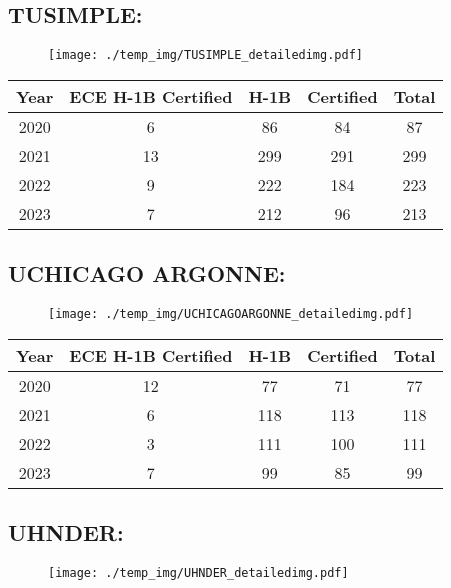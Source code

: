 \documentclass{article}%
\begin{document}
%
\newpage%
\subsection{TUSIMPLE:}%
\label{subsec:TUSIMPLE}%
\label{TUSIMPLEdetailed}%


\begin{figure}[htbp]%
\centering%
\texttt{[image: ./temp\_img/TUSIMPLE\_detailedimg.pdf]}%
\end{figure}

%
\begin{longtable}{c|c|c|c|c}%
\hline%
Year&ECE H{-}1B Certified&H{-}1B&Certified&Total\\%
\hline%
2020&6&86&84&87\\%
\hline%
2021&13&299&291&299\\%
\hline%
2022&9&222&184&223\\%
\hline%
2023&7&212&96&213\\%
\hline%
\end{longtable}

%
\newpage%
\subsection{UCHICAGO ARGONNE:}%
\label{subsec:UCHICAGOARGONNE}%
\label{UCHICAGOARGONNEdetailed}%


\begin{figure}[htbp]%
\centering%
\texttt{[image: ./temp\_img/UCHICAGOARGONNE\_detailedimg.pdf]}%
\end{figure}

%
\begin{longtable}{c|c|c|c|c}%
\hline%
Year&ECE H{-}1B Certified&H{-}1B&Certified&Total\\%
\hline%
2020&12&77&71&77\\%
\hline%
2021&6&118&113&118\\%
\hline%
2022&3&111&100&111\\%
\hline%
2023&7&99&85&99\\%
\hline%
\end{longtable}

%
\newpage%
\subsection{UHNDER:}%
\label{subsec:UHNDER}%
\label{UHNDERdetailed}%


\begin{figure}[htbp]%
\centering%
\texttt{[image: ./temp\_img/UHNDER\_detailedimg.pdf]}%
\end{figure}
\end{document}
